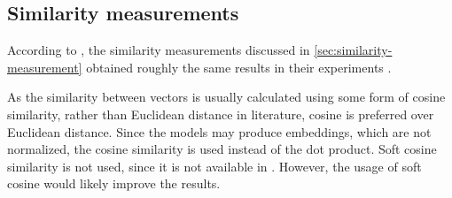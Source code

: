 \subsection*{Similarity measurements}\label{subsec:evaluation-sim-measurements}

According to \citeauthor{HfsentTrans2019}, the similarity measurements discussed in \autoref{sec:similarity-measurement} 
obtained roughly the same results in their experiments \cite{HfsentTrans2019}.   

As the similarity between vectors is usually calculated using some form of cosine similarity, 
rather than Euclidean distance in literature, cosine is preferred over Euclidean distance. 
Since the models may produce embeddings, which are not normalized, the cosine similarity is used instead of the dot product.
Soft cosine similarity is not used, since it is not available in \databaseName{}.
However, the usage of soft cosine would likely improve the results.